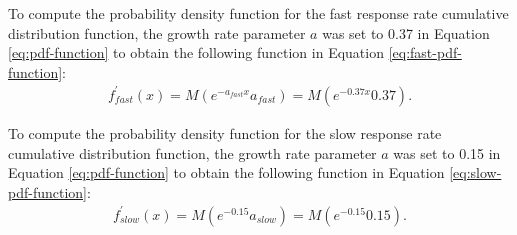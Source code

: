 \documentclass[
12pt, %
twoside,
english]{guelphthesis}
\begin{document}
\noindent To compute the probability density function for the fast
response rate cumulative distribution function, the growth rate
parameter \(a\) was set to 0.37 in Equation \ref{eq:pdf-function} to
obtain the following function in Equation \ref{eq:fast-pdf-function}:
\begin{align}
f^\prime_{fast}(x) = M (e^{-a_{fast}x}a_{fast}) = M (e^{-0.37x}0.37). 
\label{eq:fast-pdf-function}
\end {align}

\noindent To compute the probability density function for the slow
response rate cumulative distribution function, the growth rate
parameter \(a\) was set to 0.15 in Equation \ref{eq:pdf-function} to
obtain the following function in Equation \ref{eq:slow-pdf-function}:
\begin{align}
f^\prime_{slow}(x) = M (e^{-0.15}a_{slow}) = M (e^{-0.15}0.15). 
\label{eq:slow-pdf-function}
\end {align}
\end{document}
